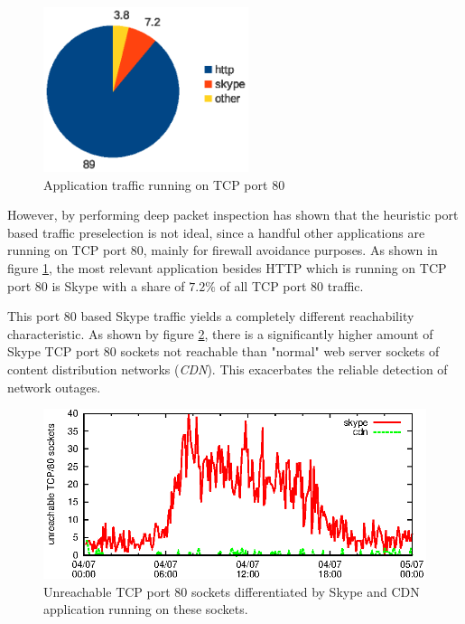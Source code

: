 \begin{figure}
	[ht] \centering
	\includegraphics[width=6cm]{images/application_fact_port_80.eps}
	\caption{Application traffic running on TCP port 80 \citep{SchatzmanThesis2012}} 
	\label{fig:tcp_port80}
\end{figure}

However, by performing deep packet inspection \citet{SchatzmanThesis2012} has 
shown that the heuristic port based traffic preselection is not ideal, since a 
handful other applications are running on TCP port 80, mainly for firewall 
avoidance purposes. 
As shown in figure \ref{fig:tcp_port80}, the most 
relevant application besides HTTP which is running on TCP port 80 is Skype with 
a share of $7.2\%$ of all TCP port 80 traffic. 

This port 80 based Skype traffic yields a completely different reachability 
characteristic. As shown by figure \ref{fig:skype_traffic}, there is a 
significantly higher amount of Skype TCP port 80 sockets not reachable than 
"normal" web server sockets of content distribution networks (\emph{CDN}). This exacerbates the reliable detection of network outages. 


\begin{figure}
	[ht] \centering
	\includegraphics[width=12cm]{images/application_fact.eps}
	\caption{Unreachable TCP port 80 sockets differentiated by Skype and CDN application running on these sockets. \citep{SchatzmanThesis2012}} 
	\label{fig:skype_traffic}
\end{figure}

